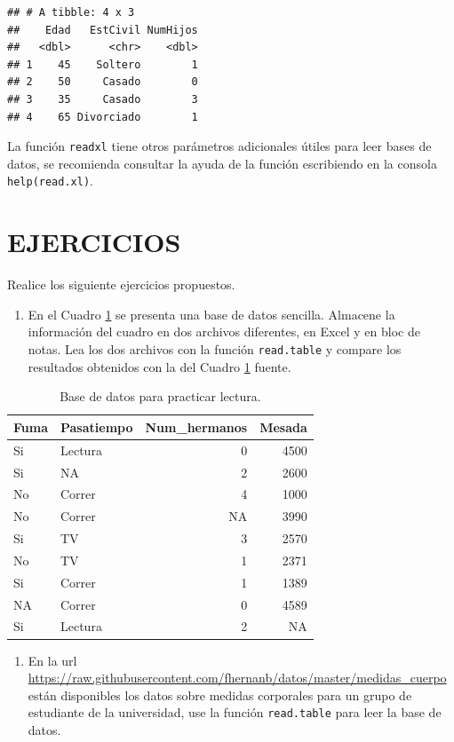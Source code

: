 \documentclass[10pt,]{krantz}
\providecommand{\tightlist}{%
  \setlength{\itemsep}{0pt}\setlength{\parskip}{0pt}}
\begin{document}
\begin{verbatim}
## # A tibble: 4 x 3
##    Edad   EstCivil NumHijos
##   <dbl>      <chr>    <dbl>
## 1    45    Soltero        1
## 2    50     Casado        0
## 3    35     Casado        3
## 4    65 Divorciado        1
\end{verbatim}

La función \texttt{readxl} tiene otros parámetros adicionales útiles
para leer bases de datos, se recomienda consultar la ayuda de la función
escribiendo en la consola \texttt{help(read.xl)}.

\section*{EJERCICIOS}\label{ejercicios-3}


Realice los siguiente ejercicios propuestos.

\begin{enumerate}
\def\labelenumi{\arabic{enumi}.}
\tightlist
\item
  En el Cuadro \ref{tab:toy} se presenta una base de datos sencilla.
  Almacene la información del cuadro en dos archivos diferentes, en
  Excel y en bloc de notas. Lea los dos archivos con la función
  \texttt{read.table} y compare los resultados obtenidos con la del
  Cuadro \ref{tab:toy} fuente.
\end{enumerate}

\begin{table}

\caption{\label{tab:toy}Base de datos para practicar lectura.}
\centering
\begin{tabular}[t]{llrr}
\toprule
Fuma & Pasatiempo & Num\_hermanos & Mesada\\
\midrule
Si & Lectura & 0 & 4500\\
Si & NA & 2 & 2600\\
No & Correr & 4 & 1000\\
No & Correr & NA & 3990\\
Si & TV & 3 & 2570\\
\addlinespace
No & TV & 1 & 2371\\
Si & Correr & 1 & 1389\\
NA & Correr & 0 & 4589\\
Si & Lectura & 2 & NA\\
\bottomrule
\end{tabular}
\end{table}

\begin{enumerate}
\def\labelenumi{\arabic{enumi}.}
\setcounter{enumi}{1}
\tightlist
\item
  En la url
  \url{https://raw.githubusercontent.com/fhernanb/datos/master/medidas_cuerpo}
  están disponibles los datos sobre medidas corporales para un grupo de
  estudiante de la universidad, use la función \texttt{read.table} para
  leer la base de datos.
\end{enumerate}
\end{document}
